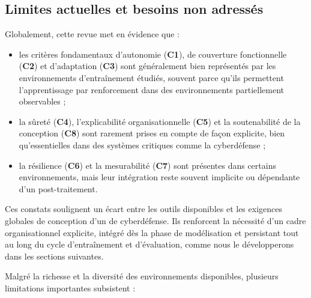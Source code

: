 \subsection{Limites actuelles et besoins non adressés}

Globalement, cette revue met en évidence que :
\begin{itemize}
  \item les critères fondamentaux d’autonomie (\textbf{C1}), de couverture fonctionnelle (\textbf{C2}) et d’adaptation (\textbf{C3}) sont généralement bien représentés par les environnements d'entraînement étudiés, souvent parce qu’ils permettent l’apprentissage par renforcement dans des environnements partiellement observables ;
  \item la sûreté (\textbf{C4}), l’explicabilité organisationnelle (\textbf{C5}) et la soutenabilité de la conception (\textbf{C8}) sont rarement prises en compte de façon explicite, bien qu’essentielles dans des systèmes critiques comme la cyberdéfense ;
  \item la résilience (\textbf{C6}) et la mesurabilité (\textbf{C7}) sont présentes dans certains environnements, mais leur intégration reste souvent implicite ou dépendante d’un post-traitement.
\end{itemize}

Ces constats soulignent un écart entre les outils disponibles et les exigences globales de conception d’un  de cyberdéfense. Ils renforcent la nécessité d’un cadre organisationnel explicite, intégré dès la phase de modélisation et persistant tout au long du cycle d’entraînement et d’évaluation, comme nous le développerons dans les sections suivantes.

\medskip

Malgré la richesse et la diversité des environnements disponibles, plusieurs limitations importantes subsistent :


